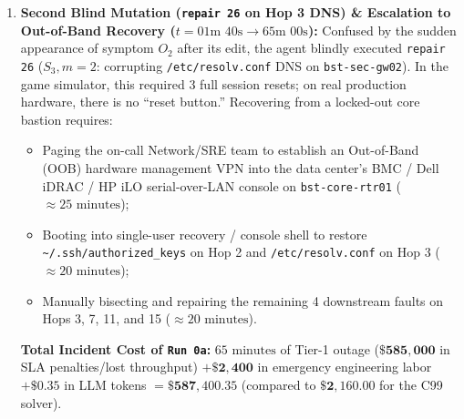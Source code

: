 \documentclass[11pt,a4paper]{article}
\theoremstyle{definition}
\theoremstyle{remark}
\begin{document}
\begin{enumerate}[leftmargin=1.6em]
\begin{itemize}
        \item All automated SSH access to Hops $2, 3, \dots, 15$ is severed simultaneously. Even worse, because SSH itself is the transport plane for Ansible/Terraform/CLI remediation, \textbf{the agent has sawed off the branch it is standing on}: it can no longer log into \texttt{bst-core-rtr01} over SSH to undo its mistake!
    \end{itemize}
    \item \textbf{Second Blind Mutation (\texttt{repair 26} on Hop 3 DNS) \& Escalation to Out-of-Band Recovery ($t = 01\text{m }40\text{s} \to 65\text{m }00\text{s}$):}
    Confused by the sudden appearance of symptom $O_2$ after its edit, the agent blindly executed \texttt{repair 26} ($S_3, m=2$: corrupting \texttt{/etc/resolv.conf} DNS on \texttt{bst-sec-gw02}). In the game simulator, this required 3 full session resets; on real production hardware, there is no ``reset button.'' Recovering from a locked-out core bastion requires:
    \begin{itemize}
        \item Paging the on-call Network/SRE team to establish an Out-of-Band (OOB) hardware management VPN into the data center's BMC / Dell iDRAC / HP iLO serial-over-LAN console on \texttt{bst-core-rtr01} ($\approx 25\text{ minutes}$);
        \item Booting into single-user recovery / console shell to restore \texttt{\textasciitilde/.ssh/authorized\_keys} on Hop 2 and \texttt{/etc/resolv.conf} on Hop 3 ($\approx 20\text{ minutes}$);
        \item Manually bisecting and repairing the remaining 4 downstream faults on Hops 3, 7, 11, and 15 ($\approx 20\text{ minutes}$).
    \end{itemize}
    \textbf{Total Incident Cost of \texttt{Run 0a}:} $65\text{ minutes}$ of Tier-1 outage ($\mathbf{\$585{,}000}$ in SLA penalties/lost throughput) $+ \mathbf{\$2{,}400}$ in emergency engineering labor $+ \mathbf{\$0.35}$ in LLM tokens $= \mathbf{\$587{,}400.35}$ (compared to $\mathbf{\$2{,}160.00}$ for the C99 solver).
\end{enumerate}
\end{document}

